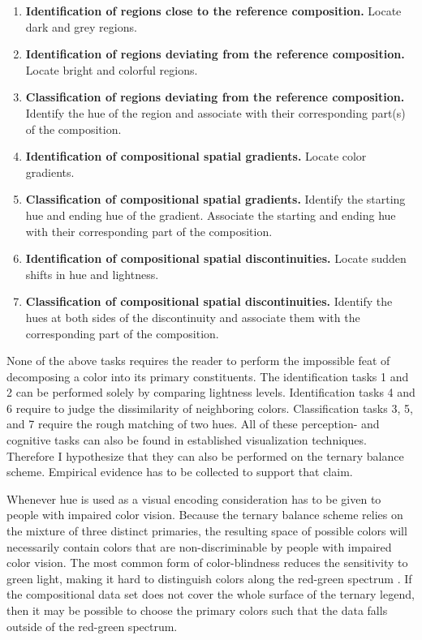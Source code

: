 \documentclass[10pt, twoside, parskip=half]{article}
\providecommand{\tightlist}{%
  \setlength{\itemsep}{0pt}\setlength{\parskip}{0pt}}
\begin{document}
\begin{enumerate}
\def\labelenumi{\arabic{enumi}.}
\tightlist
\item
  \textbf{Identification of regions close to the reference composition.}
  Locate dark and grey regions.
\item
  \textbf{Identification of regions deviating from the reference
  composition.} Locate bright and colorful regions.
\item
  \textbf{Classification of regions deviating from the reference
  composition.} Identify the hue of the region and associate with their
  corresponding part(s) of the composition.
\item
  \textbf{Identification of compositional spatial gradients.} Locate
  color gradients.
\item
  \textbf{Classification of compositional spatial gradients.} Identify
  the starting hue and ending hue of the gradient. Associate the
  starting and ending hue with their corresponding part of the
  composition.
\item
  \textbf{Identification of compositional spatial discontinuities.}
  Locate sudden shifts in hue and lightness.
\item
  \textbf{Classification of compositional spatial discontinuities.}
  Identify the hues at both sides of the discontinuity and associate
  them with the corresponding part of the composition.
\end{enumerate}

None of the above tasks requires the reader to perform the impossible
feat of decomposing a color into its primary constituents. The
identification tasks 1 and 2 can be performed solely by comparing
lightness levels. Identification tasks 4 and 6 require to judge the
dissimilarity of neighboring colors. Classification tasks 3, 5, and 7
require the rough matching of two hues. All of these perception- and
cognitive tasks can also be found in established visualization
techniques. Therefore I hypothesize that they can also be performed on
the ternary balance scheme. Empirical evidence has to be collected to
support that claim.

Whenever hue is used as a visual encoding consideration has to be given
to people with impaired color vision. Because the ternary balance scheme
relies on the mixture of three distinct primaries, the resulting space
of possible colors will necessarily contain colors that are
non-discriminable by people with impaired color vision. The most common
form of color-blindness reduces the sensitivity to green light, making
it hard to distinguish colors along the red-green spectrum
\citep{Birch2012}. If the compositional data set does not cover the
whole surface of the ternary legend, then it may be possible to choose
the primary colors such that the data falls outside of the red-green
spectrum.
\end{document}
